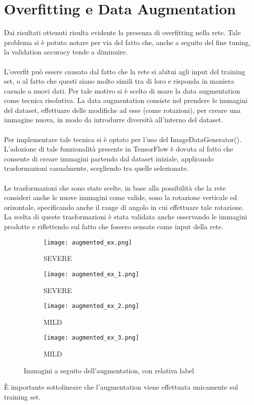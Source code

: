 \section{Overfitting e Data Augmentation}
Dai risultati ottenuti risulta evidente la presenza di overfitting nella rete.
Tale problema si è potuto notare per via del fatto che, anche a seguito del fine tuning, la validation accuracy tende 
a diminuire.
\\\\
L'overfit può essere causato dal fatto che la rete si abitui agli input del training set, o al 
fatto che questi siano molto simili tra di loro e risponda in maniera casuale a nuovi dati. Per tale motivo si è scelto di usare la data augmentation come tecnica risolutiva.
La data augmentation consiste nel prendere le immagini del dataset, effettuare delle modifiche ad esse (come rotazioni), per 
creare una immagine nuova, in modo da introdurre diversità all'interno del dataset. 
\\\\
Per implementare tale tecnica si è optato per l'uso del ImageDataGenerator(). L'adozione di tale funzionalità presente in 
TensorFlow è dovuta al fatto che consente di creare immagini partendo dal dataset iniziale, applicando trasformazioni casualmente, scegliendo tra 
quelle selezionate.
\\\\
Le trasformazioni che sono state scelte, in base alla possibilità che la rete consideri anche le nuove immagini come 
valide, sono la rotazione verticale ed orizontale, specificando anche il range di angolo in cui effettuare tale rotazione.
La scelta di queste trasformazioni è stata validata anche osservando le immagini prodotte e riflettendo sul fatto che fossero 
sensate come input della rete.
\begin{figure}[h]
    \centering
    \begin{subfigure}{.45\textwidth}
        \centering
        \texttt{[image: augmented\_ex.png]}  
        \caption{SEVERE}
    \end{subfigure}
    \begin{subfigure}{.45\textwidth}
        \centering
        \texttt{[image: augmented\_ex\_1.png]}  
        \caption{SEVERE}
    \end{subfigure}
    \begin{subfigure}{.45\textwidth}
        \centering
        \texttt{[image: augmented\_ex\_2.png]}  
        \caption{MILD}
    \end{subfigure}
    \begin{subfigure}{.45\textwidth}
        \centering
        \texttt{[image: augmented\_ex\_3.png]}  
        \caption{MILD}
    \end{subfigure}
    \caption{Immagini a seguito dell'augmentation, con relativa label}
    \label{Augmentation}
\end{figure}
È importante sottolineare che l'augmentation viene effettuata unicamente sul training set.
